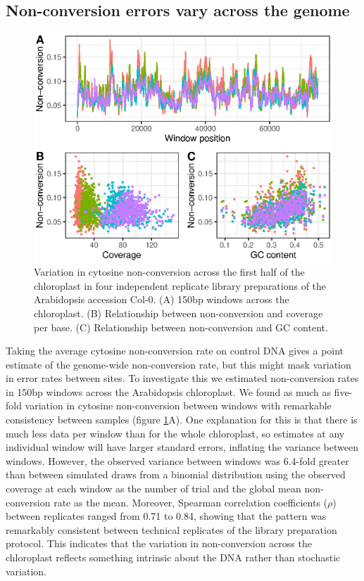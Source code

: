 \documentclass[12pt,longbibliography]{article}
\begin{document}
\subsection{Non-conversion errors vary across the genome}

\begin{figure}
    \includegraphics{figure2.eps}
    \caption{
        Variation in cytosine non-conversion across the first half of the chloroplast in four independent replicate library preparations of the Arabidopsis accession Col-0.
        (A) 150bp windows across the chloroplast.
        (B) Relationship between non-conversion and coverage per base.
        (C) Relationship between non-conversion and GC content.
    }
    \label{fig:uncertainty}
\end{figure}

Taking the average cytosine non-conversion rate on control DNA gives a point estimate of the genome-wide non-conversion rate, but this might mask variation in error rates between sites.
To investigate this we estimated non-conversion rates in 150bp windows across the Arabidopsis chloroplast.
We found as much as five-fold variation in cytosine non-conversion between windows with remarkable consistency between samples (figure \ref{fig:uncertainty}A).
One explanation for this is that there is much less data per window than for the whole chloroplast, so estimates at any individual window will have larger standard errors, inflating the variance between windows.
However, the observed variance between windows was 6.4-fold greater than between simulated draws from a binomial distribution using the observed coverage at each window as the number of trial and the global mean non-conversion rate as the mean.
Moreover, Spearman correlation coefficients ($\rho$) between replicates ranged from 0.71 to 0.84, showing that the pattern was remarkably consistent between technical replicates of the library preparation protocol.
This indicates that the variation in non-conversion across the chloroplast reflects something intrinsic about the DNA rather than stochastic variation.
\end{document}
